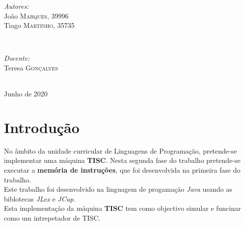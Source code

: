 \documentclass[a4paper,12pt,headings=small]{article}
\begin{document}
\begin{titlepage}
%
\begin{minipage}{0.4\textwidth}
\begin{flushleft} \large
\emph{Autores:}\\
João \textsc{Marques}, 39996\\
Tiago \textsc{Martinho}, 35735\\
\end{flushleft}
\end{minipage}
~
\begin{minipage}{0.4\textwidth}
\begin{flushright} \large
\emph{Docente:} \\
Teresa \textsc{Gonçalves} \\
\end{flushright}
\end{minipage}\\[2cm]


{\large Junho de 2020}\\[1cm]  

\vfill %

\end{titlepage}

\newpage
\thispagestyle{empty}
\renewcommand\contentsname{Índice}
\tableofcontents
\newpage

\printindex


\section{Introdução}
\FloatBarrier
No âmbito da unidade curricular de Linguagens de Programação, pretende-se implementar uma máquina \textbf{TISC}. Nesta segunda fase do trabalho pretende-se executar a \textbf{memória de instruções},  que foi desenvolvida na primeira fase do trabalho.\\
Este trabalho foi desenvolvido na linguagem de progamação \textit{Java} usando as biblotecas \textit{JLex} e \textit{JCup}.\\
Esta implementação da máquina \textbf{TISC} tem como objectivo simular e funcinar como um intrepetador de TISC.
\end{document}
